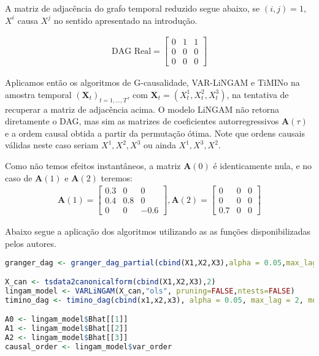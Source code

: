 \documentclass[12pt,letterpaper]{article}
\newcommand{\bd}[1]{\boldsymbol{#1}}
\begin{document}
A matriz de adjacência do grafo temporal reduzido segue abaixo, se $(i,j)=1$, $X^i$ causa $X^j$ no sentido apresentado na introdução.

\begin{align}\label{realdag}
	\text{DAG Real} = 
	\begin{bmatrix}
		0 & 1 & 1\\
		0 & 0 & 0\\
		0 & 0 & 0
	\end{bmatrix}
\end{align}

Aplicamos então os algoritmos de G-causalidade, VAR-LiNGAM e TiMINo na amostra temporal $(\bd X_t)_{t=1,\ldots,T}$, com $\bd X_t=(X^1_t,X^2_t,X^3_t)$, na tentativa de recuperar a matriz de adjacência acima. O modelo LiNGAM não retorna diretamente o DAG, mas sim as matrizes de coeficientes autorregressivos $\bd A(\tau)$ e a ordem causal obtida a partir da permutação ótima. Note que ordens causais válidas neste caso seriam $X^1,X^2,X^3$ ou ainda $X^1,X^3,X^2$.

Como não temos efeitos instantâneos, a matriz $\bd A(0)$ é identicamente nula, e no caso de $\bd A(1)$ e $\bd A(2)$ teremos:
\begin{align*}
	\bd A(1) = \begin{bmatrix}
		0.3 & 0 & 0\\
		0.4 & 0.8 & 0\\
		0 & 0 & -0.6
	\end{bmatrix},\bd A(2) = \begin{bmatrix}
	0 & 0 & 0\\
	0 & 0 & 0\\
	0.7 & 0 & 0
\end{bmatrix}
\end{align*} 

Abaixo segue a aplicação dos algoritmos utilizando as as funções disponibilizadas pelos autores.

\begin{lstlisting}[language=R]
granger_dag <- granger_dag_partial(cbind(X1,X2,X3),alpha = 0.05,max_lag = 2,output = FALSE)

X_can <- tsdata2canonicalform(cbind(X1,X2,X3),2)
lingam_model <- VARLiNGAM(X_can,"ols", pruning=FALSE,ntests=FALSE)
timino_dag <- timino_dag(cbind(x1,x2,x3), alpha = 0.05, max_lag = 2, model = traints_linear, indtest = indtestts_hsic, output = TRUE)

A0 <- lingam_model$Bhat[[1]]
A1 <- lingam_model$Bhat[[2]]
A2 <- lingam_model$Bhat[[3]]
causal_order <- lingam_model$var_order
\end{lstlisting}
\end{document}
